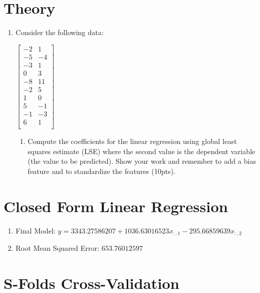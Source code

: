 \documentclass[12pt]{article}
\begin{document}
\maketitle

\section{Theory}
\begin{enumerate}
\item Consider the following data:\\
\begin{center}
$
 \begin{bmatrix}
	-2 & 1\\
	-5 & -4\\	
	-3 & 1\\
	0 & 3\\
	-8 & 11\\
	-2 & 5\\
	1 & 0\\
	5 & -1\\
	-1 & -3\\
	6 & 1\\
\end{bmatrix}
$
\end{center}
	\begin{enumerate}
	\item Compute the coefficients for the linear regression using global least squares estimate (LSE) where the second value is the dependent variable (the value to be predicted).  Show your work and remember to add a bias feature and to standardize the features (10pts).\\
	\end{enumerate}
\end{enumerate}


\newpage
\section{Closed Form Linear Regression}\label{linreg}

\begin{enumerate}
\item Final Model: $y=3343.27586207+1036.63016523x_{:,1} - 295.66859639x_{:,2}$
\item Root Mean Squared Error: $653.76012597$
\end{enumerate}

\section{S-Folds Cross-Validation}\label{linreg}
\end{document}
